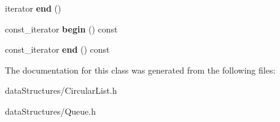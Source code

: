\begin{DoxyCompactItemize}
\item 
\hypertarget{classQueue_aae0dd33cf275e880bc244aeba0f2fc25}{iterator {\bfseries end} ()}\label{classQueue_aae0dd33cf275e880bc244aeba0f2fc25}

\item 
\hypertarget{classQueue_a652c1526d0a99cc153bec8df86105cca}{const\-\_\-iterator {\bfseries begin} () const }\label{classQueue_a652c1526d0a99cc153bec8df86105cca}

\item 
\hypertarget{classQueue_abdd805a2bb752ed37ab2dbc1493a9e24}{const\-\_\-iterator {\bfseries end} () const }\label{classQueue_abdd805a2bb752ed37ab2dbc1493a9e24}

\end{DoxyCompactItemize}


The documentation for this class was generated from the following files\-:\begin{DoxyCompactItemize}
\item 
data\-Structures/Circular\-List.\-h\item 
data\-Structures/Queue.\-h\end{DoxyCompactItemize}
